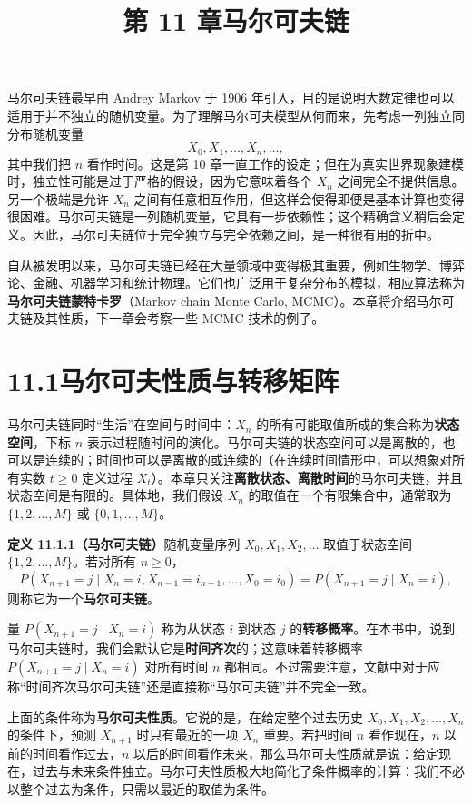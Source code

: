 \documentclass[UTF8,12pt,a4paper,fontset=fandol]{ctexart}
\title{第 11 章\quad 马尔可夫链}
\author{}
\date{}
\begin{document}
\maketitle

马尔可夫链最早由 Andrey Markov 于 1906 年引入，目的是说明大数定律也可以适用于并不独立的随机变量。为了理解马尔可夫模型从何而来，先考虑一列独立同分布随机变量
\[
  X_0,X_1,\ldots,X_n,\ldots,
\]
其中我们把 $n$ 看作时间。这是第 10 章一直工作的设定；但在为真实世界现象建模时，独立性可能是过于严格的假设，因为它意味着各个 $X_n$ 之间完全不提供信息。另一个极端是允许 $X_n$ 之间有任意相互作用，但这样会使得即便是基本计算也变得很困难。马尔可夫链是一列随机变量，它具有一步依赖性；这个精确含义稍后会定义。因此，马尔可夫链位于完全独立与完全依赖之间，是一种很有用的折中。

自从被发明以来，马尔可夫链已经在大量领域中变得极其重要，例如生物学、博弈论、金融、机器学习和统计物理。它们也广泛用于复杂分布的模拟，相应算法称为\textbf{马尔可夫链蒙特卡罗}（Markov chain Monte Carlo, MCMC）。本章将介绍马尔可夫链及其性质，下一章会考察一些 MCMC 技术的例子。

\section*{11.1\quad 马尔可夫性质与转移矩阵}

马尔可夫链同时“生活”在空间与时间中：$X_n$ 的所有可能取值所成的集合称为\textbf{状态空间}，下标 $n$ 表示过程随时间的演化。马尔可夫链的状态空间可以是离散的，也可以是连续的；时间也可以是离散的或连续的（在连续时间情形中，可以想象对所有实数 $t\ge 0$ 定义过程 $X_t$）。本章只关注\textbf{离散状态、离散时间}的马尔可夫链，并且状态空间是有限的。具体地，我们假设 $X_n$ 的取值在一个有限集合中，通常取为 $\{1,2,\ldots,M\}$ 或 $\{0,1,\ldots,M\}$。

\noindent\textbf{定义 11.1.1（马尔可夫链）}\quad 随机变量序列 $X_0,X_1,X_2,\ldots$ 取值于状态空间 $\{1,2,\ldots,M\}$。若对所有 $n\ge0$，
\[
  P(X_{n+1}=j\mid X_n=i,X_{n-1}=i_{n-1},\ldots,X_0=i_0)
  =
  P(X_{n+1}=j\mid X_n=i),
\]
则称它为一个\textbf{马尔可夫链}。

量 $P(X_{n+1}=j\mid X_n=i)$ 称为从状态 $i$ 到状态 $j$ 的\textbf{转移概率}。在本书中，说到马尔可夫链时，我们会默认它是\textbf{时间齐次}的；这意味着转移概率 $P(X_{n+1}=j\mid X_n=i)$ 对所有时间 $n$ 都相同。不过需要注意，文献中对于应称“时间齐次马尔可夫链”还是直接称“马尔可夫链”并不完全一致。

上面的条件称为\textbf{马尔可夫性质}。它说的是，在给定整个过去历史 $X_0,X_1,X_2,\ldots,X_n$ 的条件下，预测 $X_{n+1}$ 时只有最近的一项 $X_n$ 重要。若把时间 $n$ 看作现在，$n$ 以前的时间看作过去，$n$ 以后的时间看作未来，那么马尔可夫性质就是说：给定现在，过去与未来条件独立。马尔可夫性质极大地简化了条件概率的计算：我们不必以整个过去为条件，只需以最近的取值为条件。
\end{document}
